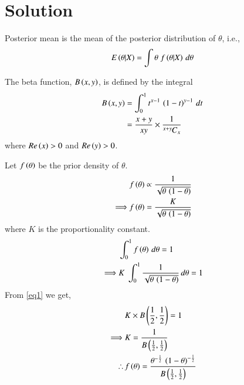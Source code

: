 \documentclass[journal,12pt,twocolumn]{IEEEtran}
\begin{document}
\section*{Solution}
\begin{definition}
Posterior mean is the mean of the posterior distribution of $\theta$, i.e., 
\begin{align}
    E\left(\theta|X\right) = \int{\theta\;f\ensuremath{\left(\theta|X\right)}\,d\theta}\label{eq5}
\end{align}

\end{definition}
\begin{definition}
The beta function, $B\left(x,y\right)$, is defined by the integral
\begin{align}
    B\left(x,y\right) &= \int_0^1 t^{x-1}\,\left(1-t\right)^{y-1}\,dt\nonumber\\
    &= \frac{x+y}{xy}\times \frac{1}{{{}^{x+y}\mkern-1muC_{x}}}\label{eq1}
\end{align}
where $Re\left(x\right)>0$ and $Re\left(y\right)>0$.
\end{definition}
Let $f\left(\theta\right)$ be the prior density of $\theta$.
\begin{align}
    &f\left(\theta\right) \propto \frac{1}{\sqrt{\theta\,\left(1-\theta\right)}}\nonumber\\
    \implies &f\left(\theta\right) = \frac{K}{\sqrt{\theta\,\left(1-\theta\right)}}
\end{align}
where $K$ is the proportionality constant.
\begin{align}
    &\int_0^1 f\left(\theta\right)\,d\theta = 1\nonumber\\
    \implies &K\;\int_0^1 \frac{1}{\sqrt{\theta\,\left(1-\theta\right)}}\,d\theta =1
\end{align}
From \eqref{eq1} we get,
\begin{align}
    &K\times B\left(\frac{1}{2},\frac{1}{2}\right) = 1\nonumber\\
    \implies &K = \frac{1}{B\left(\frac{1}{2},\frac{1}{2}\right)}\\
    \therefore\, &f\left(\theta\right) = \frac{\theta^{-\frac{1}{2}}\,\left(1-\theta\right)^{-\frac{1}{2}}}{B\left(\frac{1}{2},\frac{1}{2}\right)}\label{eq6}
\end{align}
\end{document}
